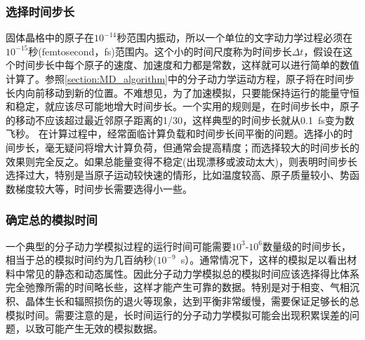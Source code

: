 \subsubsection{选择时间步长}
固体晶格中的原子在$10^{-14}$秒范围内振动，所以一个单位的文字动力学过程必须在$10^{-15}$秒\textrm{(femtosecond，fs)}范围内。这个小的时间尺度称为时间步长$\Delta t$，假设在这个时间步长中每个原子的速度、加速度和力都是常数，这样就可以进行简单的数值计算了。参照\ref{section:MD_algorithm}中的分子动力学运动方程，原子将在时间步长内向前移动到新的位置。不难想见，为了加速模拟，只要能保持运行的能量守恒和稳定，就应该尽可能地增大时间步长。一个实用的规则是，在时间步长中，原子的移动不应该超过最近邻原子距离的1/30，这样典型的时间步长就从0.1~\textrm{fs}变为数飞秒。
在计算过程中，经常面临计算负载和时间步长间平衡的问题。选择小的时间步长，毫无疑问将增大计算负荷，但通常会提高精度；而选择较大的时间步长的效果则完全反之。如果总能量变得不稳定(出现漂移或波动太大)，则表明时间步长选择过大，特别是当原子运动较快速的情形，比如温度较高、原子质量较小、势函数梯度较大等，时间步长需要选得小一些。

\subsubsection{确定总的模拟时间}
一个典型的分子动力学模拟过程的运行时间可能需要$10^3$-$10^6$数量级的时间步长，相当于总的模拟时间约为几百纳秒($10^{-9}$~\textrm{s}）。通常情况下，这样的模拟足以看出材料中常见的静态和动态属性。因此分子动力学模拟总的模拟时间应该选择得比体系完全弛豫所需的时间略长些，这样才能产生可靠的数据。特别是对于相变、气相沉积、晶体生长和辐照损伤的退火等现象，达到平衡非常缓慢，需要保证足够长的总模拟时间。需要注意的是，长时间运行的分子动力学模拟可能会出现积累误差的问题，以致可能产生无效的模拟数据。

